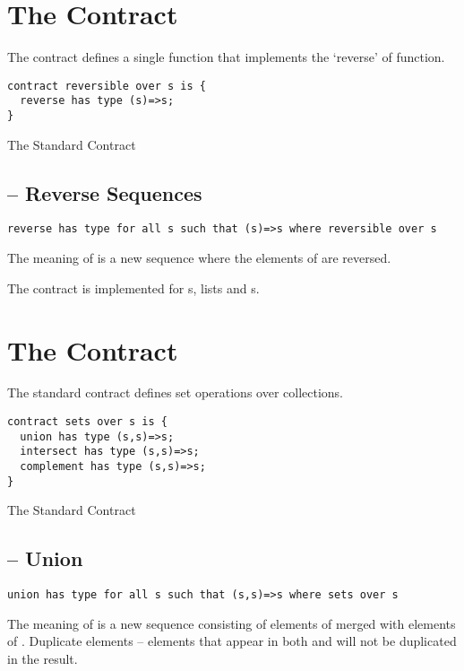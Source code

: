 \section{The  Contract}
\label{reversibleContract}
The  contract defines a single function that implements the `reverse' of function.

\begin{program}[H]
\begin{lstlisting}
contract reversible over s is {
  reverse has type (s)=>s;
}
\end{lstlisting}
\caption{The Standard  Contract}\label{reversibleContractDef}
\end{program}
\noindent

\subsection{ -- Reverse Sequences}
\label{reverseFunction}
\begin{lstlisting}
reverse has type for all s such that (s)=>s where reversible over s
\end{lstlisting}
The meaning of  is a new sequence where the elements of  are reversed.

\begin{aside}
The  contract is implemented for s,  lists and s.
\end{aside}
\section{The  Contract}
\label{setsContract}
The standard  contract defines set operations over collections. 

\begin{program}[hbtp]
\begin{lstlisting}
contract sets over s is {
  union has type (s,s)=>s;
  intersect has type (s,s)=>s;
  complement has type (s,s)=>s;
}
\end{lstlisting}
\caption{The Standard  Contract}\label{setContractDef}
\end{program}
\noindent

\subsection{ -- Union}
\label{unionFunction}
\begin{lstlisting}
union has type for all s such that (s,s)=>s where sets over s
\end{lstlisting}
The meaning of  is a new sequence consisting of elements of  merged with elements of . Duplicate elements -- elements that appear in both  and  will not be duplicated in the result.

